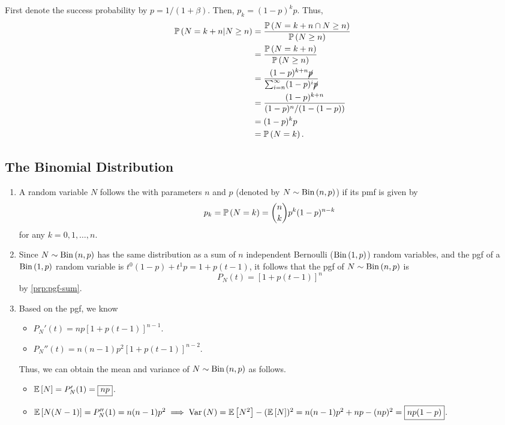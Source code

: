 \begin{enumerate}
\begin{pf}
First denote the success probability by \(p=1/(1+\beta)\). Then,
\(p_k=(1-p)^kp\). Thus,
\begin{align*}
\mathbb{P}\left(N=k+n|N\ge n\right)
&=\frac{\mathbb{P}\left(N=k+n\cap N\ge n\right)}{\mathbb{P}\left(N\ge n\right)} \\
&=\frac{\mathbb{P}\left(N=k+n\right)}{\mathbb{P}\left(N\ge n\right)} \\
&=\frac{(1-p)^{k+n}\cancel{p}}{\sum_{i=n}^{\infty}(1-p)^i\cancel{p}} \\
&=\frac{(1-p)^{k+n}}{(1-p)^n/(1-(1-p))} \\
&=(1-p)^kp\\
&=\mathbb{P}\left(N=k\right).
\end{align*}
\end{pf}
\end{enumerate}
\subsection{The Binomial Distribution}
\begin{enumerate}
\item A random variable \(N\) follows the  with
parameters \(n\) and \(p\) (denoted by \(N\sim\operatorname{Bin}\left(n,p\right)\)) if its pmf is given by
\[
p_k=\mathbb{P}\left(N=k\right)=\binom{n}{k}p^k(1-p)^{n-k}
\]
for any \(k=0,1,\dotsc,n\).
\item \label{it:bin-pgf}
Since \(N\sim\operatorname{Bin}\left(n,p\right)\) has the same distribution as a sum of \(n\)
independent Bernoulli (\(\operatorname{Bin}\left(1,p\right)\)) random variables, and the pgf of a
\(\operatorname{Bin}\left(1,p\right)\) random variable is \(t^0(1-p)+t^1p=1+p(t-1)\), it follows that
the pgf of \(N\sim\operatorname{Bin}\left(n,p\right)\) is
\[
P_N(t)=\boxed{[1+p(t-1)]^n}
\]
by \cref{prp:pgf-sum}.

\item \label{it:bin-mean-var}
Based on the pgf, we know
\begin{itemize}
\item \(P_N'(t)=np[1+p(t-1)]^{n-1}\).
\item \(P_N''(t)=n(n-1)p^2[1+p(t-1)]^{n-2}\).
\end{itemize}

Thus, we can obtain the mean and variance of \(N\sim\operatorname{Bin}\left(n,p\right)\) as follows.
\begin{itemize}
\item \(\mathbb{E}\left[N\right]=P_N'(1)=\boxed{np}\).
\item \(\mathbb{E}\left[N(N-1)\right]=P_N''(1)=n(n-1)p^2\implies
\operatorname{Var}\left(N\right)=\mathbb{E}\left[N^2\right]-(\mathbb{E}\left[N\right])^2
=n(n-1)p^2+np-(np)^2
=\boxed{np(1-p)}\).
\end{itemize}
\end{enumerate}
